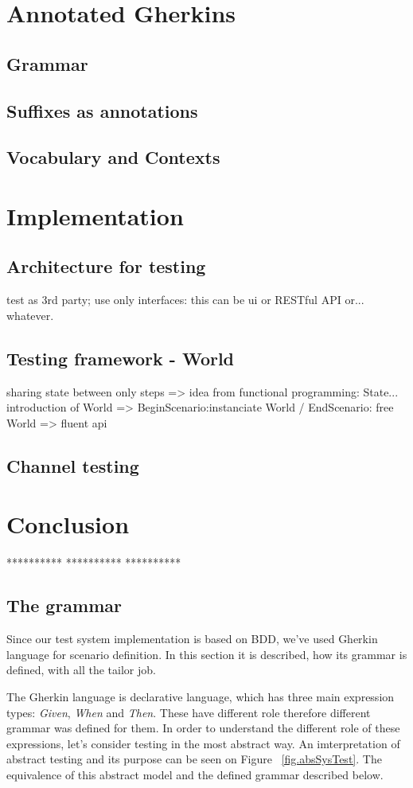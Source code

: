 \documentclass[conference]{IEEEtran}
\begin{document}
\section{Annotated Gherkins}
\subsection{Grammar}
\subsection{Suffixes as annotations}
\subsection{Vocabulary and Contexts}

\section{Implementation}
\subsection{Architecture for testing}
test as 3rd party; use only interfaces: this can be ui or RESTful API or... whatever.
\subsection{Testing framework - World}
sharing state between only steps => idea from functional programming: State... introduction of World => BeginScenario:instanciate World / EndScenario: free World => fluent api
\subsection{Channel testing}

\section{Conclusion}

**********
**********
**********

\subsection{The grammar}
Since our test system implementation is based on BDD, we've used Gherkin language for scenario definition. In this section it is described, how its grammar is defined, with all the tailor job.

The Gherkin language is declarative language, which has three main expression types: \textit{Given}, \textit{When} and \textit{Then}. These have different role therefore different grammar was defined for them. In order to understand the different role of these expressions, let's consider testing in the most abstract way. An imterpretation of abstract testing and its purpose can be seen on Figure ~\ref{fig.absSysTest}. The equivalence of this abstract model and the defined grammar described below.
\end{document}
